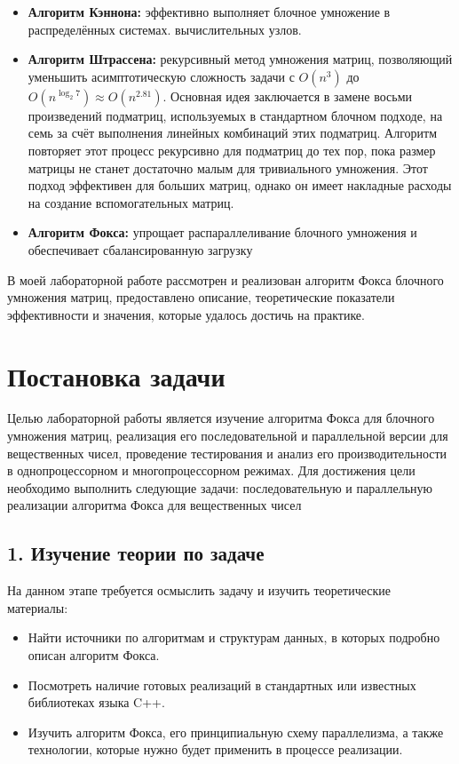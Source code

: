 \documentclass{report}
\begin{document}
\begin{itemize}
    \item \textbf{Алгоритм Кэннона:} эффективно выполняет блочное умножение в распределённых системах. 
    вычислительных узлов.
    \item \textbf{Алгоритм Штрассена:} рекурсивный метод умножения матриц, позволяющий уменьшить асимптотическую сложность задачи с \(O(n^3)\) до \(O(n^{\log_2 7}) \approx O(n^{2.81})\). Основная идея заключается в замене восьми произведений подматриц, используемых в стандартном блочном подходе, на семь за счёт выполнения линейных комбинаций этих подматриц. Алгоритм повторяет этот процесс рекурсивно для подматриц до тех пор, пока размер матрицы не станет достаточно малым для тривиального умножения. Этот подход эффективен для больших матриц, однако он имеет накладные расходы на создание вспомогательных матриц.
    \item \textbf{Алгоритм Фокса:} упрощает распараллеливание блочного умножения и обеспечивает сбалансированную загрузку
\end{itemize}

В моей лабораторной работе рассмотрен и реализован алгоритм Фокса блочного умножения матриц, предоставлено описание, теоретические показатели эффективности и значения, которые удалось достичь на практике.

\newpage

\section*{Постановка задачи}

Целью лабораторной работы является изучение алгоритма Фокса для блочного умножения матриц, реализация его последовательной и параллельной версии для вещественных чисел, проведение тестирования и анализ его производительности в однопроцессорном и многопроцессорном режимах. Для достижения цели необходимо выполнить следующие задачи:
последовательную и параллельную реализации алгоритма Фокса для вещественных чисел
\subsection*{1. Изучение теории по задаче}
На данном этапе требуется осмыслить задачу и изучить теоретические материалы:
\begin{itemize}
    \item Найти источники по алгоритмам и структурам данных, в которых подробно описан алгоритм Фокса.
    \item Посмотреть наличие готовых реализаций в стандартных или известных библиотеках языка C++.
    \item Изучить алгоритм Фокса, его принципиальную схему параллелизма, а также технологии, которые нужно будет применить в процессе реализации.
\end{itemize}
\end{document}
